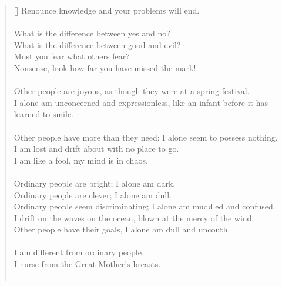 \documentclass{article}
\begin{document}
\settowidth{\versewidth}{The Wizard leads byemptying people’s minds, filling their bellies, weakening their am- bitions, and making them become strong}
\begin{verse}[\versewidth]
Renounce knowledge and your problems will end.\\
\hfill\\
What is the difference between yes and no?\\
What is the difference between good and evil?\\
Must you fear what others fear?\\
Nonsense, look how far you have missed the mark!\\
\hfill\\
Other people are joyous, as though they were at a spring festival.\\
I alone am unconcerned and expressionless, like an infant before it has learned to smile.\\
\hfill\\
Other people have more than they need; I alone seem to possess nothing.\\
I am lost and drift about with no place to go.\\
I am like a fool, my mind is in chaos.\\
\hfill\\
Ordinary people are bright; I alone am dark.\\
Ordinary people are clever; I alone am dull.\\
Ordinary people seem discriminating; I alone am muddled and confused.\\
I drift on the waves on the ocean, blown at the mercy of the wind.\\
Other people have their goals, I alone am dull and uncouth.\\
\hfill\\
I am different from ordinary people.\\
I nurse from the Great Mother's breasts.\\
\hfill\\
\end{verse}
\end{document}
